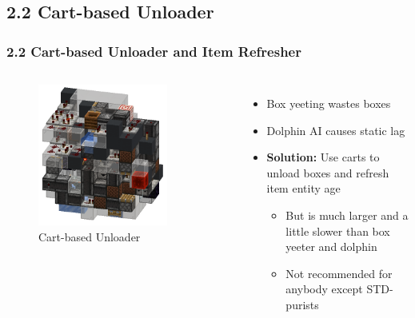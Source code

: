 \documentclass[aspectratio=169]{beamer}
\begin{document}
\subsection{2.2 Cart-based Unloader}
\begin{frame}
    \frametitle{2.2 Cart-based Unloader and Item Refresher}
    \begin{columns}

	\begin{figure}
		\includegraphics[width=0.8\textwidth]{cartyeeter.png}
		\caption{Cart-based Unloader}
	\end{figure}

    \begin{itemize}
        \item Box yeeting wastes boxes
        \item Dolphin AI causes static lag
        \item \textbf{Solution:} Use carts to unload boxes and refresh item entity age
        \begin{itemize}
            \item But is much larger and a little slower than box yeeter and dolphin
            \item Not recommended for anybody except STD-purists
        \end{itemize}
	\end{itemize}
    \end{columns}
\end{frame}
\end{document}
